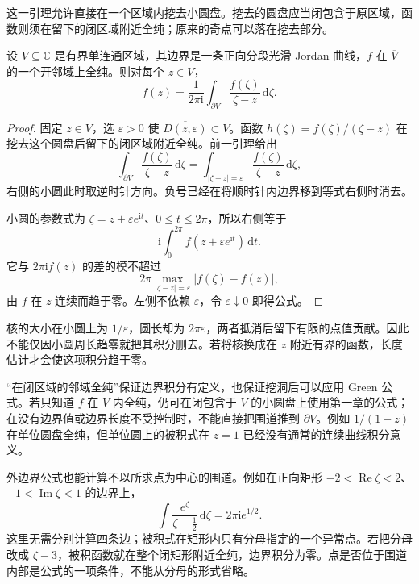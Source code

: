 这一引理允许直接在一个区域内挖去小圆盘。挖去的圆盘应当闭包含于原区域，函数则须在留下的闭区域附近全纯；原来的奇点可以落在挖去部分。

\begin{theorem}\label{b3:thm:02-cauchy-formula}
设 \(V\subseteq\mathbb C\) 是有界单连通区域，其边界是一条正向分段光滑 Jordan 曲线，\(f\) 在 \(\overline V\) 的一个开邻域上全纯。则对每个 \(z\in V\)，
\[
 f(z)=\frac1{2\pi\mathrm{i}}\int_{\partial V}
       \frac{f(\zeta)}{\zeta-z}\,\mathrm{d}\zeta.
\]
\end{theorem}
\begin{proof}
固定 \(z\in V\)，选 \(\varepsilon>0\) 使 \(\overline{D(z,\varepsilon)}\subset V\)。函数 \(h(\zeta)=f(\zeta)/(\zeta-z)\) 在挖去这个圆盘后留下的闭区域附近全纯。前一引理给出
\[
 \int_{\partial V}\frac{f(\zeta)}{\zeta-z}\,\mathrm{d}\zeta
 =\int_{|\zeta-z|=\varepsilon}
       \frac{f(\zeta)}{\zeta-z}\,\mathrm{d}\zeta,
\]
右侧的小圆此时取逆时针方向。负号已经在将顺时针内边界移到等式右侧时消去。

小圆的参数式为 \(\zeta=z+\varepsilon e^{\mathrm{i}t}\)、\(0\le t\le2\pi\)，所以右侧等于
\[
 \mathrm{i}\int_0^{2\pi}f(z+\varepsilon e^{\mathrm{i}t})\,\mathrm{d}t.
\]
它与 \(2\pi\mathrm{i}f(z)\) 的差的模不超过
\[
 2\pi\max_{|\zeta-z|=\varepsilon}|f(\zeta)-f(z)|,
\]
由 \(f\) 在 \(z\) 连续而趋于零。左侧不依赖 \(\varepsilon\)，令 \(\varepsilon\downarrow0\) 即得公式。
\end{proof}

核的大小在小圆上为 \(1/\varepsilon\)，圆长却为 \(2\pi\varepsilon\)，两者抵消后留下有限的点值贡献。因此不能仅因小圆周长趋零就把其积分删去。若将核换成在 \(z\) 附近有界的函数，长度估计才会使这项积分趋于零。

\ProseParagraphBreak

“在闭区域的邻域全纯”保证边界积分有定义，也保证挖洞后可以应用 Green 公式。若只知道 \(f\) 在 \(V\) 内全纯，仍可在闭包含于 \(V\) 的小圆盘上使用第一章的公式；在没有边界值或边界长度不受控制时，不能直接把围道推到 \(\partial V\)。例如 \(1/(1-z)\) 在单位圆盘全纯，但单位圆上的被积式在 \(z=1\) 已经没有通常的连续曲线积分意义。

\ProseParagraphBreak

外边界公式也能计算不以所求点为中心的围道。例如在正向矩形
\(-2<\operatorname{Re}\zeta<2\)、\(-1<\operatorname{Im}\zeta<1\) 的边界上，
\[
 \int\frac{e^\zeta}{\zeta-\tfrac12}\,\mathrm{d}\zeta
 =2\pi\mathrm{i}e^{1/2}.
\]
这里无需分别计算四条边；被积式在矩形内只有分母指定的一个异常点。若把分母改成 \(\zeta-3\)，被积函数就在整个闭矩形附近全纯，边界积分为零。点是否位于围道内部是公式的一项条件，不能从分母的形式省略。

